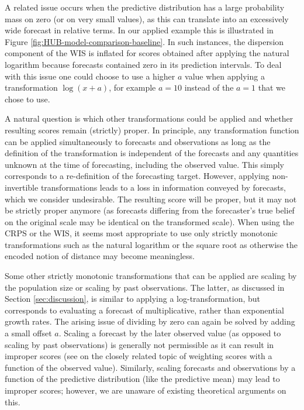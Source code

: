 \documentclass{article}
\begin{document}
A related issue occurs when the predictive distribution has a large probability mass on zero (or on very small values), as this can translate into an excessively wide forecast in relative terms. In our applied example this is illustrated in Figure \ref{fig:HUB-model-comparison-baseline}. In such instances, the dispersion component of the WIS is inflated for scores obtained after applying the natural logarithm because forecasts contained zero in its prediction intervals. To deal with this issue one could choose to use a higher $a$ value when applying a transformation $\log(x + a)$, for example $a = 10$ instead of the $a = 1$ that we chose to use.

A natural question is which other transformations could be applied and whether resulting scores remain (strictly) proper. In principle, any transformation function can be applied simultaneously to forecasts and observations as long as the definition of the transformation is independent of the forecasts and any quantities unknown at the time of forecasting, including the observed value. This simply corresponds to a re-definition of the forecasting target. However, applying non-invertible transformations leads to a loss in information conveyed by forecasts, which we consider undesirable. The resulting score will be proper, but it may not be strictly proper anymore (as forecasts differing from the forecaster's true belief on the original scale may be identical on the transformed scale). When using the CRPS or the WIS, it seems most appropriate to use only strictly monotonic transformations such as the natural logarithm or the square root as otherwise the encoded notion of distance may become meaningless. 

Some other strictly monotonic transformations that can be applied are scaling by the population size or scaling by past observations. The latter, as discussed in Section \ref{sec:discussion}, is similar to applying a log-transformation, but corresponds to evaluating a forecast of multiplicative, rather than exponential growth rates. The arising issue of dividing by zero can again be solved by adding a small offset $a$. Scaling a forecast by the later observed value (as opposed to scaling by past observations) is generally not permissible as it can result in improper scores (see \citealt{lerchForecasterDilemmaExtreme2015} on the closely related topic of weighting scores with a function of the observed value). Similarly, scaling forecasts and observations by a function of the predictive distribution (like the predictive mean) may lead to improper scores; however, we are unaware of existing theoretical arguments on this. 
\end{document}
